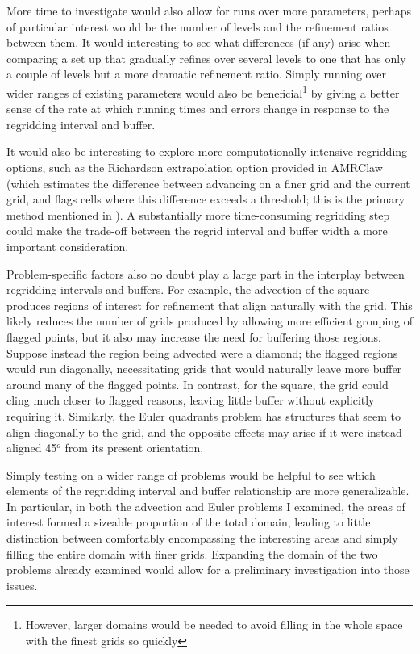 \documentclass[11pt]{article}
\begin{document}
More time to investigate would also allow for runs over more parameters, perhaps
of particular interest would be the number of levels and the refinement
ratios between them. It would interesting to see what differences (if any)
arise when comparing a set up that gradually refines over several levels
to one that has only a couple of levels but a more dramatic refinement
ratio. Simply running over wider ranges of existing parameters would
also be beneficial\footnote{However, larger domains would be needed to 
avoid filling in the whole space with the finest grids so quickly} by
giving a better sense of the rate at which running times and errors
change in response to the regridding interval and buffer.

It would also be interesting to explore more computationally intensive
regridding options, such as the Richardson extrapolation option provided
in AMRClaw (which estimates the difference between advancing on a finer grid
and the current grid, and flags cells where this difference exceeds a threshold;
this is the primary method mentioned in \cite{BergerLeVeque98}). A substantially
more time-consuming regridding step could make the trade-off between the
regrid interval and buffer width a more important consideration.

Problem-specific factors also no doubt play a large part in the interplay
between regridding intervals and buffers. For example, the advection of
the square produces regions of interest for refinement that align naturally
with the grid. This likely reduces the number of grids produced by allowing  
more efficient grouping of flagged points, but it also may increase the 
need for buffering those regions. Suppose instead the region being advected
were a diamond; the flagged regions would run diagonally, necessitating
grids that would naturally leave more buffer around many of the flagged points.
In contrast, for the square, the grid could cling much closer to flagged reasons,
leaving little buffer without explicitly requiring it. Similarly, the Euler 
quadrants problem has structures that seem to align diagonally to the grid,
and the opposite effects may arise if it were instead aligned 45$^o$ from its
present orientation.

Simply testing on a wider range of problems would be helpful to see which
elements of the regridding interval and buffer relationship are more generalizable.
In particular, in both the advection and Euler problems I examined, the areas of
interest formed a sizeable proportion of the total domain, leading to little
distinction between comfortably encompassing the interesting areas and simply
filling the entire domain with finer grids. Expanding the domain of the
two problems already examined would allow for a preliminary investigation into 
those issues.

\printbibliography
\end{document}
